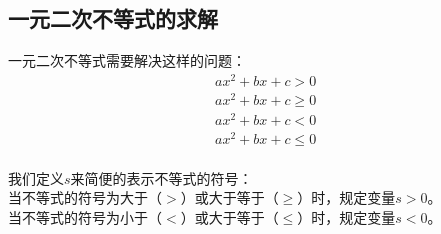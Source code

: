 \documentclass[UTF8]{ctexart}
\begin{document}
\newpage

\subsection{一元二次不等式的求解}
    一元二次不等式需要解决这样的问题：
    \setcounter{equation}{0}
    \begin{align}
        &ax^2+bx+c>0\\[3mm]
        &ax^2+bx+c\geq 0\\[3mm]
        &ax^2+bx+c<0\\[3mm]
        &ax^2+bx+c\leq 0
    \end{align}\\
    我们定义$s$来简便的表示不等式的符号：\\[3mm]
    当不等式的符号为大于（$>$）或大于等于（$\geq$）时，规定变量$s>0$。\\[3mm]
    当不等式的符号为小于（$<$）或大于等于（$\leq$）时，规定变量$s<0$。\\
\end{document}
